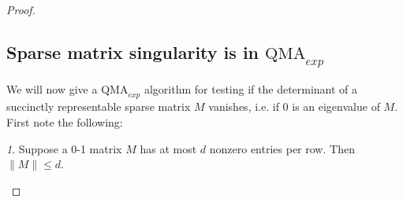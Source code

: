 \documentclass[english]{article}
\numberwithin{equation}{section}
\numberwithin{figure}{section}
\theoremstyle{plain}
\theoremstyle{definition}
\theoremstyle{plain}
\theoremstyle{definition}
\theoremstyle{remark}
\newtheorem{rem}[thm]{\protect\remarkname}
\theoremstyle{remark}
\theoremstyle{plain}
\providecommand{\remarkname}{Remark}
\begin{document}
\begin{proof}
\subsection{Sparse matrix singularity is in $\text{QMA}_{exp}$}
We will now give a $\text{QMA}_{exp}$ algorithm for testing if the determinant of a succinctly representable sparse matrix $M$ vanishes, i.e. if 0 is an eigenvalue of $M$. First note the following:
\begin{rem}
Suppose a 0-1 matrix $M$ has at most $d$ nonzero entries per row. Then $\| M \| \le d$.
\end{rem}


\end{proof}
\end{document}
